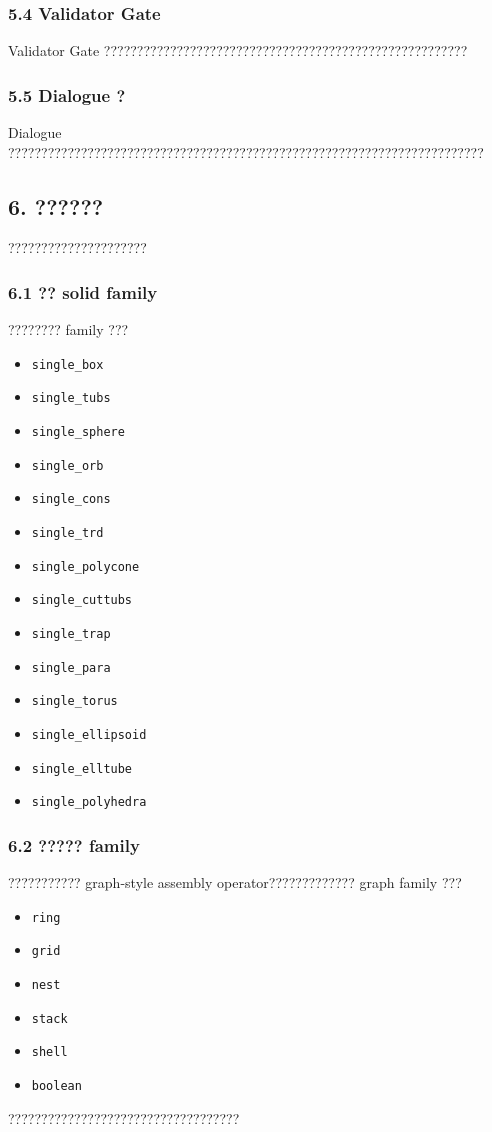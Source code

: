 \documentclass[11pt,a4paper]{ctexart}
\begin{document}
\subsubsection*{5.4 Validator Gate}
Validator Gate ???????????????????????????????????????????????????????
\subsubsection*{5.5 Dialogue ?}
Dialogue ????????????????????????????????????????????????????????????????????????
\subsection*{6. ??????}
?????????????????????
\subsubsection*{6.1 ?? solid family}
???????? family ???
\begin{itemize}
\item \texttt{single\_box}
\item \texttt{single\_tubs}
\item \texttt{single\_sphere}
\item \texttt{single\_orb}
\item \texttt{single\_cons}
\item \texttt{single\_trd}
\item \texttt{single\_polycone}
\item \texttt{single\_cuttubs}
\item \texttt{single\_trap}
\item \texttt{single\_para}
\item \texttt{single\_torus}
\item \texttt{single\_ellipsoid}
\item \texttt{single\_elltube}
\item \texttt{single\_polyhedra}
\end{itemize}
\subsubsection*{6.2 ????? family}
??????????? graph-style assembly operator????????????? graph family ???
\begin{itemize}
\item \texttt{ring}
\item \texttt{grid}
\item \texttt{nest}
\item \texttt{stack}
\item \texttt{shell}
\item \texttt{boolean}
\end{itemize}
???????????????????????????????????
\end{document}
